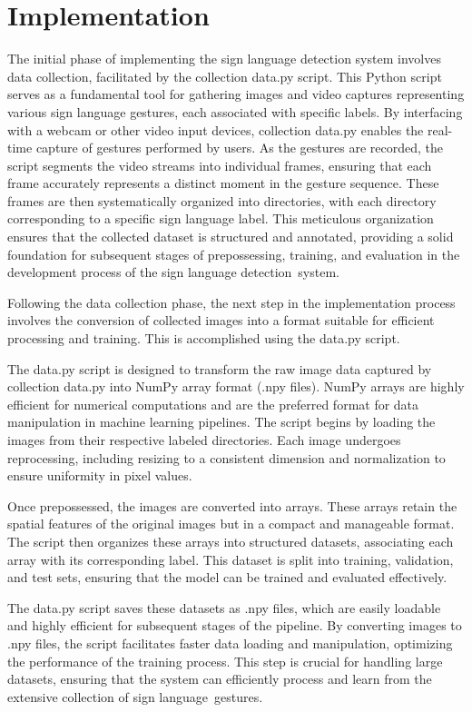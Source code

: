 \chapter{Implementation} 
The initial phase of implementing the sign language detection system involves data collection, facilitated by the collection data.py script. This Python script serves as a fundamental tool for gathering images and video captures representing various sign language gestures, each associated with specific labels. By interfacing with a webcam or other video input devices, collection data.py enables the real-time capture of gestures performed by users. As the gestures are recorded, the script segments the video streams into individual frames, ensuring that each frame accurately represents a distinct moment in the gesture sequence. These frames are then systematically organized into directories, with each directory corresponding to a specific sign language label. This meticulous organization ensures that the collected dataset is structured and annotated, providing a solid foundation for subsequent stages of prepossessing, training, and evaluation in the development process of the sign language detection system.

Following the data collection phase, the next step in the implementation process involves the conversion of collected images into a format suitable for efficient processing and training. This is accomplished using the data.py script.

The data.py script is designed to transform the raw image data captured by collection data.py into NumPy array format (.npy files). NumPy arrays are highly efficient for numerical computations and are the preferred format for data manipulation in machine learning pipelines. The script begins by loading the images from their respective labeled directories. Each image undergoes reprocessing, including resizing to a consistent dimension and normalization to ensure uniformity in pixel values.

Once prepossessed, the images are converted into arrays. These arrays retain the spatial features of the original images but in a compact and manageable format. The script then organizes these arrays into structured datasets, associating each array with its corresponding label. This dataset is split into training, validation, and test sets, ensuring that the model can be trained and evaluated effectively.

The data.py script saves these datasets as .npy files, which are easily loadable and highly efficient for subsequent stages of the pipeline. By converting images to .npy files, the script facilitates faster data loading and manipulation, optimizing the performance of the training process. This step is crucial for handling large datasets, ensuring that the system can efficiently process and learn from the extensive collection of sign language gestures.

